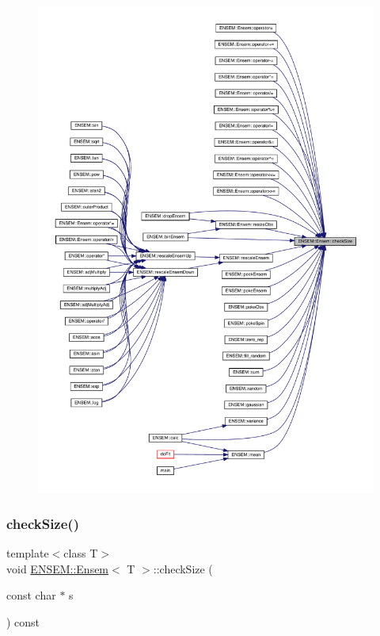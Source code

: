 \begin{figure}[H]
\begin{center}
\leavevmode
\includegraphics[width=350pt]{d7/d3e/classENSEM_1_1Ensem_a32978c0e251d9731bdb83c6069eb059d_icgraph}
\end{center}
\end{figure}
\mbox{\label{classENSEM_1_1Ensem_a32978c0e251d9731bdb83c6069eb059d}} 
\subsubsection{\texorpdfstring{checkSize()}{checkSize()}\hspace{0.1cm}{\footnotesize\ttfamily [3/6]}}
{\footnotesize\ttfamily template$<$class T$>$ \\
void \mbox{\hyperlink{classENSEM_1_1Ensem}{E\+N\+S\+E\+M\+::\+Ensem}}$<$ T $>$\+::check\+Size (\begin{DoxyParamCaption}\item[{const char $\ast$}]{s }\end{DoxyParamCaption}) const\hspace{0.3cm}{\ttfamily [inline]}}

